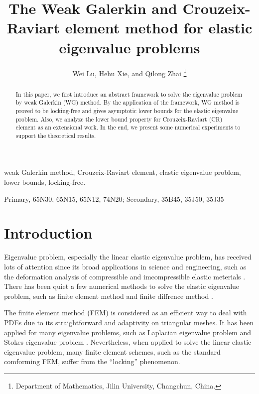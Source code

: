 \documentclass[leqno,CJK]{siamltex704}
\numberwithin{equation}{section}
\begin{document}
	
	\title{The Weak Galerkin and Crouzeix-Raviart element method for elastic eigenvalue problems}
	\author{
		Wei Lu, Hehu Xie, and Qilong Zhai
		\thanks{Department of Mathematics, Jilin University, Changchun,
			China. }
		}
	\maketitle
	
	\begin{abstract}
		In this paper, we first introduce an abstract framework to solve the eigenvalue problem by weak Galerkin (WG) method. By the application of the framework, WG method is proved to be locking-free and gives asymptotic lower bounds for the elastic eigenvalue problem. Also, we analyze the lower bound property for Crouzeix-Raviart (CR) element as an extensional work. In the end, we present some numerical experiments to support the theoretical results.
	\end{abstract}
	
	\begin{keywords} weak Galerkin method, Crouzeix-Raviart element, elastic eigenvalue problem, lower bounds, locking-free.
	\end{keywords}
	
	\begin{AMS}
		Primary, 65N30, 65N15, 65N12, 74N20; Secondary, 35B45, 35J50, 35J35
	\end{AMS}
	
	
\section{Introduction}
Eigenvalue problem, especially the linear elastic eigenvalue problem, has received lots of attention since its broad applications in science and engineering, such as the deformation analysis of compressible and imcompressible elastic meterials \cite{Vogelius1983}. There has been quiet a few numerical methods to solve the elastic eigenvalue problem, such as finite element method \cite{Meddahi2013,Inzunza2023,Zhang2024} and finite diffrence method \cite{Yang2023,Lyu2024}.

The finite element method (FEM) is considered as an efficient way to deal with PDEs due to its straightforward and adaptivity on triangular meshes. It has been applied for many eigenvalue problems, such as Laplacian eigenvalue problem \cite{Liu2013,Grebenkov2013,Luo2012} and Stokes eigenvalue problem \cite{Feng2014,Chen2009}. Nevertheless, when applied to solve the linear elastic eigenvalue problem, many finite element schemes, such as the standard comforming FEM, suffer from the “locking” phenomenon.
\end{document}
